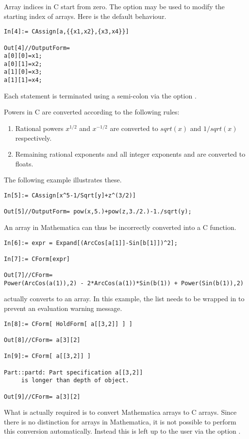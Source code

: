 \documentclass [12pt,twoside]{article}
\begin{document}
Array indices in C start from zero. The option  may be used
to modify the starting index of arrays. Here is the default behaviour.
\begin{verbatim}
In[4]:= CAssign[a,{{x1,x2},{x3,x4}}]

Out[4]//OutputForm=
a[0][0]=x1;
a[0][1]=x2;
a[1][0]=x3;
a[1][1]=x4;
\end{verbatim}
Each statement is terminated using a semi-colon via the option .

\pagebreak[2]

\noindent
Powers in C are converted according to the following rules:
\begin{enumerate}
\item Rational powers $x^{1/2}$ and $x^{-1/2}$ are converted to $sqrt(x)$
and $1/{sqrt(x)}$ respectively.
\item Remaining rational exponents and all integer exponents and are
converted to floats.
\end{enumerate}
The following example illustrates these.

\begin{verbatim}
In[5]:= CAssign[x^5-1/Sqrt[y]+z^(3/2)]

Out[5]//OutputForm= pow(x,5.)+pow(z,3./2.)-1./sqrt(y);
\end{verbatim}
An array in Mathematica  can thus be incorrectly converted into a C function.

\begin{verbatim}
In[6]:= expr = Expand[(ArcCos[a[1]]-Sin[b[1]])^2];

In[7]:= CForm[expr]

Out[7]//CForm=
Power(ArcCos(a(1)),2) - 2*ArcCos(a(1))*Sin(b(1)) + Power(Sin(b(1)),2)
\end{verbatim}
 actually converts  to an array. In this example, the list
 needs to be wrapped in  to prevent an evaluation warning message.

\begin{verbatim}
In[8]:= CForm[ HoldForm[ a[[3,2]] ] ]

Out[8]//CForm= a[3][2]

In[9]:= CForm[ a[[3,2]] ]

Part::partd: Part specification a[[3,2]]
     is longer than depth of object.

Out[9]//CForm= a[3][2]
\end{verbatim}
What is actually required is to convert Mathematica arrays to C arrays.
Since there is no distinction for arrays in Mathematica, it is not possible to perform
this conversion automatically. Instead this is left up to the user
via the option .
\end{document}
